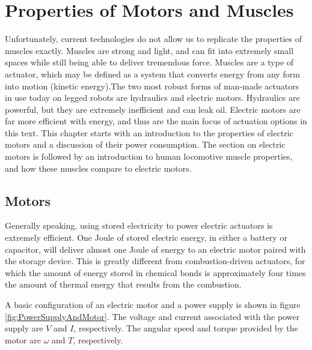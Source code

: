 
\chapter{Properties of Motors and Muscles}
\label{sec:PropertiesOfMotorsAndMuscles}

Unfortunately, current technologies do not allow us to replicate the properties of muscles exactly. Muscles are strong and light, and can fit into extremely small spaces while still being able to deliver tremendous force. Muscles are a type of actuator, which may be defined as a system that converts energy from any form into motion (kinetic energy).The two most robust forms of man-made actuators in use today on legged robots are hydraulics and electric motors. Hydraulics are powerful, but they are extremely inefficient and can leak oil. Electric motors are far more efficient with energy, and thus are the main focus of actuation options in this text. This chapter starts with an introduction to the properties of electric motors and a discussion of their power consumption. The section on electric motors is followed by an introduction to human locomotive muscle properties, and how these muscles compare to electric motors.

\section{Motors} %
\label{IntroductionToMotors}

Generally speaking, using stored electricity to power electric actuators is extremely efficient. One Joule of stored electric energy, in either a battery or capacitor, will deliver almost one Joule of energy to an electric motor paired with the storage device. This is greatly different from combustion-driven actuators, for which the amount of energy stored in chemical bonds is approximately four times the amount of thermal energy that results from the combustion.

A basic configuration of an electric motor and a power supply is shown in figure \ref{fig:PowerSupplyAndMotor}. The voltage and current associated with the power supply are $V$ and $I$, respectively. The angular speed and torque provided by the motor are $\omega$ and $T$, respectively.

